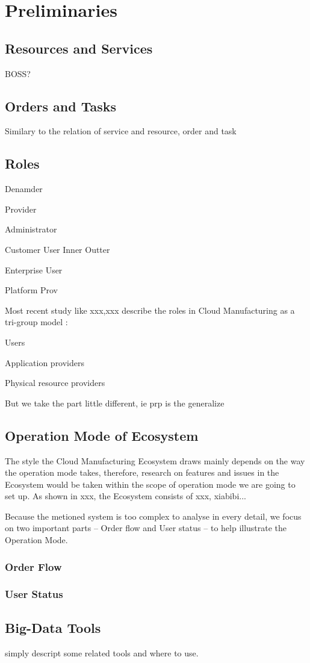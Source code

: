 \section{Preliminaries} %
\subsection{Resources and Services}

BOSS?

\subsection{Orders and Tasks}
Similary to the relation of service and resource, order and task 

\subsection{Roles}
Denamder

Provider

Administrator

Customer User
	Inner
	Outter

Enterprise User

Platform Prov

Most recent study like xxx,xxx describe the roles in Cloud Manufacturing as a tri-group model :\begin{inparaenum}[1)]
\item Users
\item Application providers
\item Physical resource providers
\end{inparaenum}

But we take the part little different, ie prp is the generalize

\subsection{Operation Mode of Ecosystem}
The style the Cloud Manufacturing Ecosystem draws mainly depends on the way the operation mode takes, therefore, research on features and issues in the Ecosystem would be taken within the scope of operation mode we are going to set up. As shown in xxx, the Ecosystem consists of xxx,  xiabibi...

Because the metioned system is too complex to analyse in every detail, we focus on two important parts -- Order flow and User status -- to help illustrate the Operation Mode.

\subsubsection{Order Flow}

\subsubsection{User Status}

\subsection{Big-Data Tools}
simply descript some related tools and where to use.
